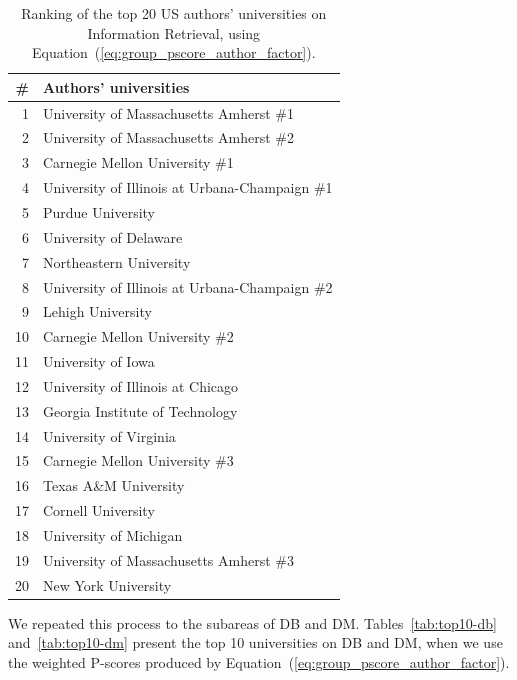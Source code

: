 \documentclass[msc]{ppgccufmg}
\begin{document}
\begin{table}[htbp]
\centering
\caption{Ranking of the top 20 US authors' universities on Information Retrieval, using Equation~(\ref{eq:group_pscore_author_factor}).}
\label{tab:top-authors}
\begin{tabular}{rl}
	\toprule
	\# & Authors' universities \\
	\midrule
	1  & University of Massachusetts Amherst \#1        \\
	2  & University of Massachusetts Amherst \#2        \\
	3  & Carnegie Mellon University \#1                 \\
	4  & University of Illinois at Urbana-Champaign \#1 \\
	5  & Purdue University                            \\
	6  & University of Delaware                       \\
	7  & Northeastern University                      \\
	8  & University of Illinois at Urbana-Champaign \#2 \\
	9  & Lehigh University                            \\
	10 & Carnegie Mellon University \#2                 \\
	11 & University of Iowa                           \\
	12 & University of Illinois at Chicago            \\
	13 & Georgia Institute of Technology              \\
	14 & University of Virginia                       \\
	15 & Carnegie Mellon University \#3                 \\
	16 & Texas A\&M University                        \\
	17 & Cornell University                           \\
	18 & University of Michigan                       \\
	19 & University of Massachusetts Amherst \#3        \\
	20 & New York University                          \\
\bottomrule
\end{tabular}
\end{table}

We repeated this process to the subareas of DB and DM. Tables~\ref{tab:top10-db} and~\ref{tab:top10-dm} present the top 10 universities on DB and DM, when we use the weighted P-scores produced by Equation~(\ref{eq:group_pscore_author_factor}).
\end{document}
